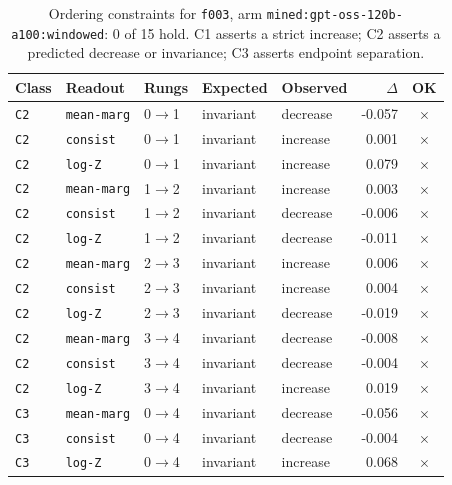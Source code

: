 \documentclass[11pt]{article}
\begin{document}
\begin{table}[htbp]
\centering
\small
\caption{Ordering constraints for \texttt{f003}, arm \texttt{mined:gpt-oss-120b-a100:windowed}: 0 of 15 hold. C1 asserts a strict increase; C2 asserts a predicted decrease or invariance; C3 asserts endpoint separation.}
\label{tab:ladder-f003-mined-gpt-oss-120b-a100-windowed}
\begin{tabular}{lllllrc}
\toprule
Class & Readout & Rungs & Expected & Observed & $\Delta$ & OK \\
\midrule
\texttt{C2} & \texttt{mean-marg} & 0$\to$1 & invariant & decrease & -0.057 & $\times$ \\
\texttt{C2} & \texttt{consist} & 0$\to$1 & invariant & increase & 0.001 & $\times$ \\
\texttt{C2} & \texttt{log-Z} & 0$\to$1 & invariant & increase & 0.079 & $\times$ \\
\texttt{C2} & \texttt{mean-marg} & 1$\to$2 & invariant & increase & 0.003 & $\times$ \\
\texttt{C2} & \texttt{consist} & 1$\to$2 & invariant & decrease & -0.006 & $\times$ \\
\texttt{C2} & \texttt{log-Z} & 1$\to$2 & invariant & decrease & -0.011 & $\times$ \\
\texttt{C2} & \texttt{mean-marg} & 2$\to$3 & invariant & increase & 0.006 & $\times$ \\
\texttt{C2} & \texttt{consist} & 2$\to$3 & invariant & increase & 0.004 & $\times$ \\
\texttt{C2} & \texttt{log-Z} & 2$\to$3 & invariant & decrease & -0.019 & $\times$ \\
\texttt{C2} & \texttt{mean-marg} & 3$\to$4 & invariant & decrease & -0.008 & $\times$ \\
\texttt{C2} & \texttt{consist} & 3$\to$4 & invariant & decrease & -0.004 & $\times$ \\
\texttt{C2} & \texttt{log-Z} & 3$\to$4 & invariant & increase & 0.019 & $\times$ \\
\texttt{C3} & \texttt{mean-marg} & 0$\to$4 & invariant & decrease & -0.056 & $\times$ \\
\texttt{C3} & \texttt{consist} & 0$\to$4 & invariant & decrease & -0.004 & $\times$ \\
\texttt{C3} & \texttt{log-Z} & 0$\to$4 & invariant & increase & 0.068 & $\times$ \\
\bottomrule
\end{tabular}
\end{table}
\end{document}
